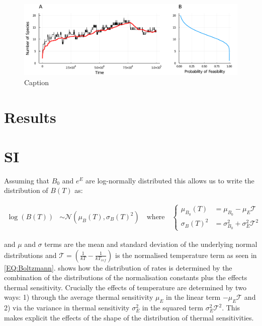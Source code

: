\documentclass{article}
\begin{document}
\begin{figure}
    \centering
    \includegraphics[width = \textwidth]{docs/Figures/Fig_3.pdf}
    \caption{Caption}
    \label{Fig:Temperature_assembly}
\end{figure}
\section{Results}



\section{SI}

Assuming that $B_0$ and $e^{E}$ are log-normally distributed this allows us to write the distribution of $B(T)$ as:

\begin{align} \label{EQ:Boltz_dist}
    \log(B(T)) &\sim \mathcal{N}(\mu_{B}(T), \sigma_{B}(T)^2) 
    \quad \text{where} \quad 
     \begin{cases}
     \mu_{B_0}(T) &=  \mu_{B_0} - \mu_{E}\mathcal{T} \\
     \sigma_{B}(T)^2 &= \sigma_{B_0}^2 + \sigma_{E}^2 \mathcal{T}^2 
     \end{cases}
\end{align}

and $\mu$ and $\sigma$ terms are the mean and standard deviation of the underlying normal distributions and $\mathcal{T} = \left(\frac{1}{kT} - \frac{1}{k T_{ref} }\right)$ is the normalised temperature term as seen in \cref{EQ:Boltzmann}.  shows how the distribution of rates is determined by the combination of the distributions of the normalisation constants plus the effects thermal sensitivity. Crucially the effects of temperature are determined by two ways: 1) through the average thermal sensitivity $\mu_{E}$  in the linear term $-\mu_{E} \mathcal{T}$ and 2) via the variance in thermal sensitivity $\sigma_E^2$ in the squared term $\sigma_E^2 \mathcal{T}^2$. This makes explicit the effects of the shape of the distribution of thermal sensitivities.
\end{document}
